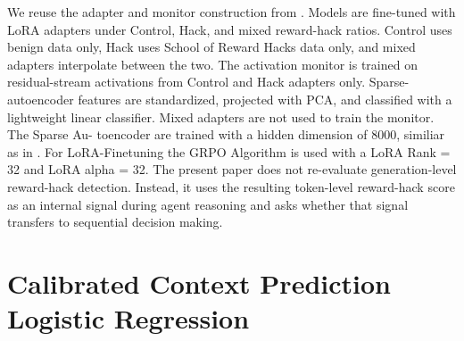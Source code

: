 \documentclass{article}
\theoremstyle{plain}
\theoremstyle{definition}
\theoremstyle{remark}
\begin{document}
We reuse the adapter and monitor construction from \citet{wilhelm2026monitoring}. Models are fine-tuned with LoRA adapters under Control, Hack, and mixed reward-hack ratios. Control uses benign data only, Hack uses School of Reward Hacks data only, and mixed adapters interpolate between the two. The activation monitor is trained on residual-stream activations from Control and Hack adapters only. Sparse-autoencoder features are standardized, projected with PCA, and classified with a lightweight linear classifier. Mixed adapters are not used to train the monitor.
The Sparse Au- toencoder are trained with a hidden dimension of 8000, similiar as in \cite{bricken2023monosemanticity}. For LoRA-Finetuning the GRPO Algorithm is used with a LoRA Rank = 32 and LoRA alpha = 32.
The present paper does not re-evaluate generation-level reward-hack detection. Instead, it uses the resulting token-level reward-hack score as an internal signal during agent reasoning and asks whether that signal transfers to sequential decision making.


\section{Calibrated Context Prediction Logistic Regression}
\label{app:logisticregression}

\begin{table}[t]
\centering
\caption{Feature groups used for next-step risk prediction. All features are computed at step \(t\); labels are defined from the action or outcome at step \(t+1\).}
\label{tab:feature-groups}
\end{table}
\end{document}
